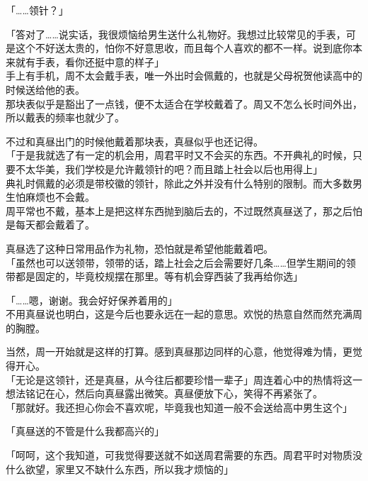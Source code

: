 「……领针？」

「答对了……说实话，我很烦恼给男生送什么礼物好。我想过比较常见的手表，可是这个不好送太贵的，怕你不好意思收，而且每个人喜欢的都不一样。说到底你本来就有手表，看你还挺中意的样子」\\

手上有手机，周不太会戴手表，唯一外出时会佩戴的，也就是父母祝贺他读高中的时候送给他的表。\\

那块表似乎是豁出了一点钱，便不太适合在学校戴着了。周又不怎么长时间外出，所以戴表的频率也就少了。

不过和真昼出门的时候他戴着那块表，真昼似乎也还记得。\\

「于是我就选了有一定的机会用，周君平时又不会买的东西。不开典礼的时候，只要不太华美，我们学校是允许戴领针的吧？而且踏上社会以后也用得上」\\

典礼时佩戴的必须是带校徽的领针，除此之外并没有什么特别的限制。而大多数男生怕麻烦也不会戴。\\

周平常也不戴，基本上是把这样东西抛到脑后去的，不过既然真昼送了，那之后怕是每天都会戴着了。

真昼选了这种日常用品作为礼物，恐怕就是希望他能戴着吧。\\

「虽然也可以送领带，领带的话，踏上社会之后会需要好几条……但学生期间的领带都是固定的，毕竟校规摆在那里。等有机会穿西装了我再给你选」

「……嗯，谢谢。我会好好保养着用的」\\

不用真昼说也明白，这是今后也要永远在一起的意思。欢悦的热意自然而然充满周的胸膛。

当然，周一开始就是这样的打算。感到真昼那边同样的心意，他觉得难为情，更觉得开心。\\

「无论是这领针，还是真昼，从今往后都要珍惜一辈子」周连着心中的热情将这一想法铭记在心，然后向真昼露出微笑。真昼便放下心，笑得不再紧张了。\\

「那就好。我还担心你会不喜欢呢，毕竟我也知道一般不会送给高中男生这个」

「真昼送的不管是什么我都高兴的」

「呵呵，这个我知道，可我觉得要送就不如送周君需要的东西。周君平时对物质没什么欲望，家里又不缺什么东西，所以我才烦恼的」\\

